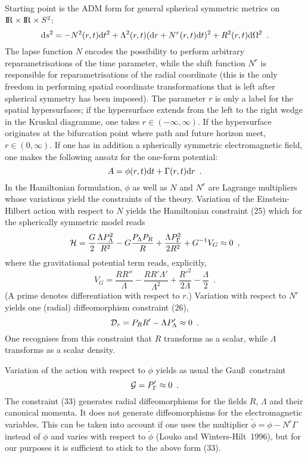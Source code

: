 \documentclass[12pt]{article}
\def\D{{\rm d}}
\def\bbbr{{\rm I\!R}} %
\newcommand{\be}{\begin{equation}}
\newcommand{\ee}{\end{equation}}
\begin{document}
Starting point is the ADM form for general spherical symmetric
metrics on $\bbbr\times\bbbr\times S^2$:
\be \D s^2= -N^2(r,t)\D t^2 + \Lambda^2(r,t)(\D r+N^r(r,t)\D t)^2+
    R^2(r,t)\D\Omega^2 \enspace . \ee
The lapse function $N$ encodes the possibility to perform arbitrary
reparametrisations of the time parameter, while the shift function
$N^r$ is responsible for reparametrisations of the radial
coordinate (this is the only freedom in performing spatial
coordinate transformations that is left after spherical symmetry has been
imposed). The parameter $r$ is only a label for the spatial
hypersurfaces; if the hypersurface extends from the left to the
right wedge in the Kruskal diagramme, one takes $r\in(-\infty,
\infty)$. If the hypersurface originates at the bifurcation point
where path and future horizon meet, $r\in(0, \infty)$. 
If one has in addition a spherically symmetric electromagnetic field,
one makes the following ansatz for the one-form potential:
\be A=\phi(r,t)\D t+\Gamma(r,t)\D r \enspace . \ee
In the Hamiltonian formulation, $\phi$ as well as $N$ and $N^r$
are Lagrange multipliers whose variations yield the constraints of the
theory. Variation of the Einstein-Hilbert action
 with respect to $N$ yields the Hamiltonian
constraint (25) which for the spherically symmetric model reads
\be {\cal H}= \frac{G}{2}\frac{\Lambda P_{\Lambda}^2}{R^2}
  -G\frac{P_{\Lambda}P_R}{R}+ \frac{\Lambda P_{\Gamma}^2}
    {2R^2}+G^{-1}V_G \approx 0 \enspace , \ee
where the gravitational potential term reads, explicitly,
\be V_G= \frac{RR''}{\Lambda}- \frac{RR'\Lambda'}{\Lambda^2}
   +\frac{R'^2}{2\Lambda}-\frac{\Lambda}{2} \enspace . \ee
(A prime denotes differentiation with respect to $r$.)
Variation with respect to $N^r$ yields one (radial) diffeomorphism
constraint (26),
\be {\cal D}_r= P_RR'- \Lambda P_{\Lambda}'\approx 0 \enspace . \ee
One recognises from this constraint that $R$ transforms as
a scalar, while $\Lambda$ transforms as a scalar density.

Variation of the action with respect to $\phi$ yields as usual the Gau\ss\
constraint
\be {\cal G}= P_{\Gamma}'\approx 0 \enspace . \ee
The constraint (33) generates radial diffeomorphisms for the fields
$R$, $\Lambda$ and their canonical momenta. It does not
generate diffeomorphisms for the electromagnetic variables.
This can be taken into account if one uses the multiplier
$\tilde{\phi}=\phi-N^r\Gamma$ instead of $\phi$ and varies
with respect to $\tilde{\phi}$
(Louko and Winters-Hilt~1996), but for our purposes it is sufficient
to stick to the above form (33).
\end{document}
